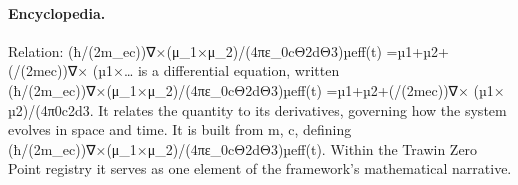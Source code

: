 \paragraph{Encyclopedia.}
Relation: (ħ/(2m\_ec))∇×(μ\_1×μ\_2)/(4πε\_0cΘ2dΘ3)µeff(t) =µ1+µ2+(/(2mec))∇× (µ1×… is a differential equation, written (ħ/(2m\_ec))∇×(μ\_1×μ\_2)/(4πε\_0cΘ2dΘ3)µeff(t) =µ1+µ2+(/(2mec))∇× (µ1× µ2)/(4π0c2d3. It relates the quantity to its derivatives, governing how the system evolves in space and time. It is built from m, c, defining (ħ/(2m\_ec))∇×(μ\_1×μ\_2)/(4πε\_0cΘ2dΘ3)µeff(t). Within the Trawin Zero Point registry it serves as one element of the framework's mathematical narrative.

